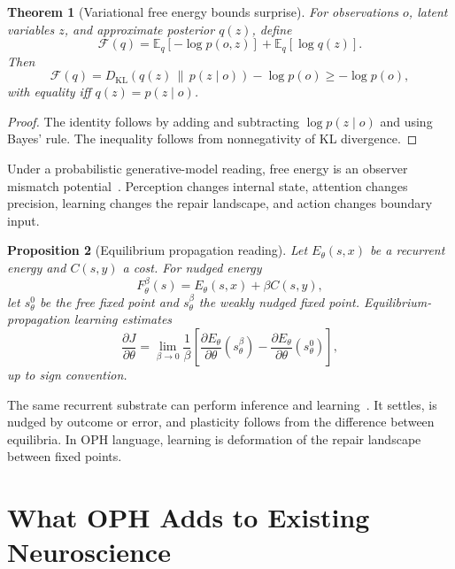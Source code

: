 \documentclass[11pt]{article}
\newtheorem{theorem}{Theorem}[section]
\newtheorem{proposition}[theorem]{Proposition}
\theoremstyle{remark}
\theoremstyle{plain}
\newcommand{\E}{\mathbb E}
\begin{document}
\begin{theorem}[Variational free energy bounds surprise]
For observations \(o\), latent variables \(z\), and approximate posterior \(q(z)\), define
\[
\mathcal F(q)=
\E_q[-\log p(o,z)]+\E_q[\log q(z)].
\]
Then
\[
\mathcal F(q)
=
D_{\mathrm{KL}}\!\left(q(z)\,\|\,p(z\mid o)\right)
-\log p(o)
\ge
-\log p(o),
\]
with equality iff \(q(z)=p(z\mid o)\).
\end{theorem}

\begin{proof}
The identity follows by adding and subtracting \(\log p(z\mid o)\) and using Bayes' rule. The inequality follows from nonnegativity of KL divergence.
\end{proof}

Under a probabilistic generative-model reading, free energy is an observer mismatch potential~\cite{Friston2010}. Perception changes internal state, attention changes precision, learning changes the repair landscape, and action changes boundary input.

\begin{proposition}[Equilibrium propagation reading]
Let \(E_\theta(s,x)\) be a recurrent energy and \(C(s,y)\) a cost. For nudged energy
\[
F_\theta^\beta(s)=E_\theta(s,x)+\beta C(s,y),
\]
let \(s_\theta^0\) be the free fixed point and \(s_\theta^\beta\) the weakly nudged fixed point. Equilibrium-propagation learning estimates
\[
\frac{\partial J}{\partial\theta}
=
\lim_{\beta\to0}
\frac1\beta
\left[
\frac{\partial E_\theta}{\partial\theta}(s_\theta^\beta)
-
\frac{\partial E_\theta}{\partial\theta}(s_\theta^0)
\right],
\]
up to sign convention.
\end{proposition}

The same recurrent substrate can perform inference and learning~\cite{ScellierBengio2017}. It settles, is nudged by outcome or error, and plasticity follows from the difference between equilibria. In OPH language, learning is deformation of the repair landscape between fixed points.

\section{What OPH Adds to Existing Neuroscience}
\end{document}
